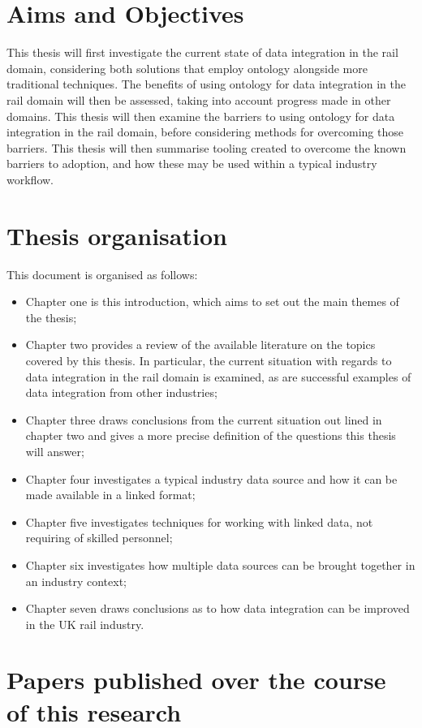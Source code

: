 \section{Aims and Objectives}
This thesis will first investigate the current state of data integration in the rail domain, considering both solutions that employ ontology alongside more traditional techniques. The benefits of using ontology for data integration in the rail domain will then be assessed, taking into account progress made in other domains. This thesis will then examine the barriers to using ontology for data integration in the rail domain, before considering methods for overcoming those barriers. This thesis will then summarise tooling created to overcome the known barriers to adoption, and how these may be used within a typical industry workflow.

\section{Thesis organisation}
This document is organised as follows:

\begin{itemize}
	\item Chapter one is this introduction, which aims to set out the main themes of the thesis;
	\item Chapter two provides a review of the available literature on the topics covered by this thesis. In particular, the current situation with regards to data integration in the rail domain is examined, as are successful examples of data integration from other industries;
	\item Chapter three draws conclusions from the current situation out lined in chapter two and gives a more precise definition of the questions this thesis will answer;
	\item Chapter four investigates a typical industry data source and how it can be made available in a linked format;
	\item Chapter five investigates techniques for working with linked data, not requiring of skilled personnel;
	\item Chapter six investigates how multiple data sources can be brought together in an industry context;
	\item Chapter seven draws conclusions as to how data integration can be improved in the UK rail industry.
\end{itemize}

\section{Papers published over the course of this research}

